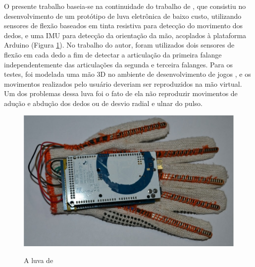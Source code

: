 O presente trabalho baseia-se na continuidade do trabalho de , que consistiu no desenvolvimento de um protótipo de luva eletrônica de baixo custo, utilizando sensores de flexão baseados em tinta resistiva para detecção do movimento dos dedos, e uma \ac{IMU} para detecção da orientação da mão, acoplados à plataforma Arduino (Figura \ref{fig:luvaroversi}). No trabalho do autor, foram utilizados dois sensores de flexão em cada dedo a fim de detectar a articulação da primeira falange independentemente das articulações da segunda e terceira falanges. Para os testes, foi modelada uma mão \ac{3D} no ambiente de desenvolvimento de jogos , e os movimentos realizados pelo usuário deveriam ser reproduzidos na mão virtual. Um dos problemas dessa luva foi o fato de ela não reproduzir movimentos de adução e abdução dos dedos ou de desvio radial e ulnar do pulso.

\begin{figure}[H]
  \setlength{\abovecaptionskip}{0pt}
  \setlength{\belowcaptionskip}{0pt}
  \caption[A luva de ]{A luva de }
  \centering
  \includegraphics[width=.5\textwidth]{imagem/2016roversi}
  \captionsetup{justification=centering}
  \label{fig:luvaroversi}
\end{figure}
